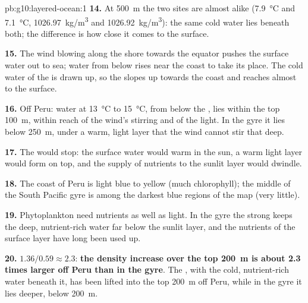 \begin{solution}{pb:g10:layered-ocean:1}
\textbf{14.} At \qty{500}{m} the two sites are almost alike
(\qty{7.9}{\degreeCelsius} and \qty{7.1}{\degreeCelsius},
\qty{1026.97}{kg/m^3} and \qty{1026.92}{kg/m^3}): the same cold water lies
beneath both; the difference is how close it comes to the surface.

\textbf{15.} The wind blowing along the shore towards the equator pushes the
surface water out to sea; water from below rises near the coast to take its
place. The cold water of the  is drawn up, so the 
slopes up towards the coast and reaches almost to the surface.

\textbf{16.} Off Peru: water at \qty{13}{\degreeCelsius} to
\qty{15}{\degreeCelsius}, from below the , lies within the top
\qty{100}{m}, within reach of the wind's stirring and of the light. In the
gyre it lies below \qty{250}{m}, under a warm, light layer that the wind
cannot stir that deep.

\textbf{17.} The  would stop: the surface water would warm in the
sun, a warm light layer would form on top, and the supply of nutrients to
the sunlit layer would dwindle.

\textbf{18.} The coast of Peru is light blue to yellow (much chlorophyll);
the middle of the South Pacific gyre is among the darkest blue regions of the
map (very little).

\textbf{19.} Phytoplankton need nutrients as well as light. In the gyre the
strong  keeps the deep, nutrient-rich water far below the sunlit
layer, and the nutrients of the surface layer have long been used up.

\textbf{20.} $1.36/0.59 \approx 2.3$: \textbf{the density increase over the
top \qty{200}{m} is about 2.3 times larger off Peru than in the gyre}. The
, with the cold, nutrient-rich water beneath it, has been lifted
into the top \qty{200}{m} off Peru, while in the gyre it lies deeper, below
\qty{200}{m}.
\end{solution}

